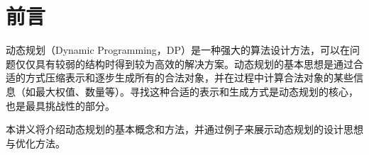 \chapter*{前言}

动态规划（Dynamic Programming，DP）是一种强大的算法设计方法，可以在问题仅仅具有较弱的结构时得到较为高效的解决方案。动态规划的基本思想是通过合适的方式压缩表示和逐步生成所有的合法对象，并在过程中计算合法对象的某些信息（如最大权值、数量等）。寻找这种合适的表示和生成方式是动态规划的核心，也是最具挑战性的部分。

本讲义将介绍动态规划的基本概念和方法，并通过例子来展示动态规划的设计思想与优化方法。

